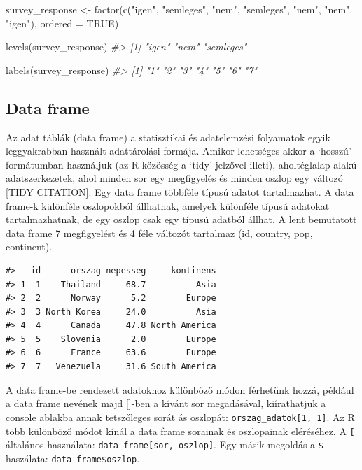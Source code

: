 \documentclass[
]{book}
\newenvironment{Shaded}{\begin{snugshade}}{\end{snugshade}}
\newcommand{\AttributeTok}[1]{\textcolor[rgb]{0.77,0.63,0.00}{#1}}
\newcommand{\CommentTok}[1]{\textcolor[rgb]{0.56,0.35,0.01}{\textit{#1}}}
\newcommand{\ConstantTok}[1]{\textcolor[rgb]{0.00,0.00,0.00}{#1}}
\newcommand{\FunctionTok}[1]{\textcolor[rgb]{0.00,0.00,0.00}{#1}}
\newcommand{\NormalTok}[1]{#1}
\newcommand{\OtherTok}[1]{\textcolor[rgb]{0.56,0.35,0.01}{#1}}
\newcommand{\StringTok}[1]{\textcolor[rgb]{0.31,0.60,0.02}{#1}}
\begin{document}
\begin{Shaded}
\begin{Highlighting}[]
\NormalTok{survey\_response }\OtherTok{\textless{}{-}} \FunctionTok{factor}\NormalTok{(}\FunctionTok{c}\NormalTok{(}\StringTok{"igen"}\NormalTok{, }\StringTok{"semleges"}\NormalTok{, }\StringTok{"nem"}\NormalTok{, }\StringTok{"semleges"}\NormalTok{, }\StringTok{"nem"}\NormalTok{, }\StringTok{"nem"}\NormalTok{, }\StringTok{"igen"}\NormalTok{), }\AttributeTok{ordered =} \ConstantTok{TRUE}\NormalTok{)}


\FunctionTok{levels}\NormalTok{(survey\_response)}
\CommentTok{\#\textgreater{} [1] "igen"     "nem"      "semleges"}

\FunctionTok{labels}\NormalTok{(survey\_response)}
\CommentTok{\#\textgreater{} [1] "1" "2" "3" "4" "5" "6" "7"}
\end{Highlighting}
\end{Shaded}

\hypertarget{data-frame}{%
\subsection{Data frame}\label{data-frame}}

Az adat táblák (data frame) a statisztikai és adatelemzési folyamatok
egyik leggyakrabban használt adattárolási formája. Amikor lehetséges
akkor a `hosszú' formátumban használjuk (az R közösség a `tidy' jelzővel
illeti), aholtéglalap alakú adatszerkezetek, ahol minden sor egy
megfigyelés és minden oszlop egy változó {[}TIDY CITATION{]}. Egy data
frame többféle típusú adatot tartalmazhat. A data frame-k különféle
oszlopokból állhatnak, amelyek különféle típusú adatokat
tartalmazhatnak, de egy oszlop csak egy típusú adatból állhat. A lent
bemutatott data frame 7 megfigyelést és 4 féle változót tartalmaz (id,
country, pop, continent).

\begin{verbatim}
#>   id      orszag nepesseg     kontinens
#> 1  1    Thailand     68.7          Asia
#> 2  2      Norway      5.2        Europe
#> 3  3 North Korea     24.0          Asia
#> 4  4      Canada     47.8 North America
#> 5  5    Slovenia      2.0        Europe
#> 6  6      France     63.6        Europe
#> 7  7   Venezuela     31.6 South America
\end{verbatim}

A data frame-be rendezett adatokhoz különböző módon férhetünk hozzá,
például a data frame nevének majd {[}{]}-ben a kívánt sor megadásával,
kiírathatjuk a console ablakba annak tetszőleges sorát ás oszlopát:
\texttt{orszag\_adatok{[}1,\ 1{]}}. Az R több különböző módot kínál a
data frame sorainak és oszlopainak eléréséhez. A \texttt{{[}} általános
használata: \texttt{data\_frame{[}sor,\ oszlop{]}}. Egy másik megoldás a
\texttt{\$} haszálata: \texttt{data\_frame\$oszlop}.
\end{document}
